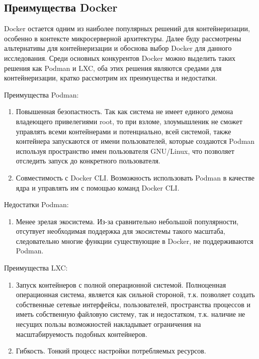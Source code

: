\documentclass[a4paper, 14pt]{extreport}
\begin{document}
\subsection{Преимущества Docker}
\par Docker остается одним из наиболее популярных решений для контейнеризации, особенно в контексте микросерверной архитектуры. Далее
буду рассмотрены альтернативы для контейнеризации и обоснова выбор Docker для данного исследования. Среди основных конкурентов Docker
можно выделить таких решения как Podman и LXC, оба этих решения являются средами для контейнеризации, кратко рассмотрим их преимущества
и недостатки.
\par\noindent Преимущества Podman:
\begin{enumerate}
        \item Повышенная безопастность. Так как система не имеет единого демона владеющего привелегиями root, то при взломе,
              злоумышленик не сможет управлять всеми контейнерами и потенциально, всей системой, также контейнера запускаются от имени
              пользователей, которые создаются Podman используя пространство имен пользователя GNU/Linux, что позволяет отследить 
              запуск до конкретного пользователя.
        \item Совместимость с Docker CLI. Возможность использовать Podman в качестве ядра и управлять им с помощью команд Docker CLI.
\end{enumerate}
\par\noindent Недостатки Podman:
\begin{enumerate}
        \item Менее зрелая экосистема. Из-за сравнительно небольшой популярности, отсутвует необходимая поддержка для экосистемы такого
              масштаба, следовательно многие функции существующие в Docker, не поддерживаются Podman.
\end{enumerate}
\par\noindent Преимущества LXC:
\begin{enumerate}
        \item Запуск контейнеров с полной операционной системой. Полноценная операционная система, является как сильной стороной, т.к.
              позволяет создать собственные сетевые интерфейсы, пользователей, пространства процессов и иметь собственную файловую
              систему, так и недостатком, т.к. наличие не несущих пользы возможностей накладывает ограничения на масштабируемость 
              подобных контейнеров.
        \item Гибкость. Тонкий процесс настройки потребляемых ресурсов.
\end{enumerate}
\end{document}

